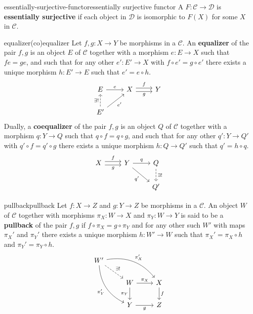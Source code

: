 \begin{topic}{essentially-surjective-functor}{essentially surjective functor}
    A  $F \colon \mathcal{C} \to \mathcal{D}$ is \textbf{essentially surjective} if each object in $\mathcal{D}$ is isomorphic to $F(X)$ for some $X$ in $\mathcal{C}$.
\end{topic}

\begin{topic}{equalizer}{(co)equalizer}
    Let $f, g \colon X \to Y$ be morphisms in a  $\mathcal{C}$. An \textbf{equalizer} of the pair $f, g$ is an object $E$ of $\mathcal{C}$ together with a morphism $e \colon E \to X$ such that $fe = ge$, and such that for any other $e' \colon E' \to X$ with $f \circ e' = g \circ e'$ there exists a unique morphism $h \colon E' \to E$ such that $e' = e \circ h$.
    \[ \svg \begin{tikzcd} E \arrow{r}{e} & X \arrow[shift left=0.25em]{r}{f} \arrow[swap, shift right=0.25em]{r}{g} & Y \\ E' \arrow[dashed]{u}{\exists!} \arrow[swap]{ur}{e'} && \end{tikzcd} \]
    Dually, a \textbf{coequalizer} of the pair $f, g$ is an object $Q$ of $\mathcal{C}$ together with a morphism $q \colon Y \to Q$ such that $q \circ f = q \circ g$, and such that for any other $q' \colon Y \to Q'$ with $q' \circ f = q' \circ g$ there exists a unique morphism $h \colon Q \to Q'$ such that $q' = h \circ q$.
    \[ \svg \begin{tikzcd} X \arrow[shift left=0.25em]{r}{f} \arrow[swap, shift right=0.25em]{r}{g} & Y \arrow{r}{q} \arrow[swap]{dr}{q'} & Q \arrow[dashed]{d}{\exists!} \\ && Q' \end{tikzcd} \]
\end{topic}

\begin{topic}{pullback}{pullback}
    Let $f \colon X \to Z$ and $g \colon Y \to Z$ be morphisms in a  $\mathcal{C}$. An object $W$ of $\mathcal{C}$ together with morphisms $\pi_X: W \to X$ and $\pi_Y \colon W \to Y$ is said to be a \textbf{pullback} of the pair $f, g$ if $f \circ \pi_X = g \circ \pi_Y$ and for any other such $W'$ with maps $\pi_X'$ and $\pi_Y'$ there exists a unique morphism $h \colon W' \to W$ such that $\pi_X' = \pi_X \circ h$ and $\pi_Y' = \pi_Y \circ h$.
    \[ \svg \begin{tikzcd} W' \arrow[bend left=30]{rrd}{\pi_X'} \arrow[swap, bend right=30]{ddr}{\pi_Y'} \arrow[dashed]{rd}{\exists!} & & \\ & W \arrow{r}{\pi_X} \arrow[swap]{d}{\pi_Y} & X \arrow{d}{f} \\ & Y \arrow[swap]{r}{g} & Z \end{tikzcd} \]
\end{topic}


